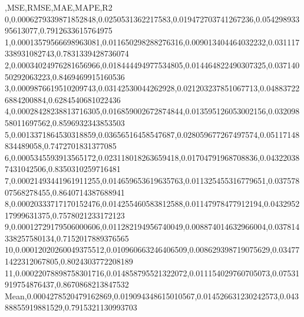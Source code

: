 ,MSE,RMSE,MAE,MAPE,R2
0,0.0006279339871852848,0.0250531362217583,0.019472703741267236,0.05429893395613077,0.7912633615764975
1,0.00013579566698963081,0.011650298288276316,0.009013404464032232,0.031117338931082743,0.7831339428736074
2,0.00034024976281656966,0.018444494977534805,0.014464822490307325,0.03714050292063223,0.8469469915160536
3,0.0009876619510209743,0.03142530044262928,0.021203237851067713,0.048837226884200884,0.6284540681022436
4,0.00028428238813716305,0.016859002672874844,0.013595126053002156,0.03209858011697562,0.8596932343853503
5,0.0013371864530318859,0.03656516458547687,0.028059677267497574,0.05117148834489058,0.7472701831377085
6,0.0005345593913565172,0.023118018263659418,0.01704791968708836,0.043220387431042506,0.8350310259716481
7,0.00021493441961911255,0.014659653619635763,0.011325455316779651,0.03757807568278455,0.8640714387688941
8,0.00020333717170152476,0.014255460583812588,0.01147978477912194,0.043295217999631375,0.7578021233172123
9,0.00012729179506000606,0.011282194956740049,0.008874014632966004,0.037814338257580134,0.7152017889376565
10,0.00012020260049375512,0.010960663246406509,0.008629398719075629,0.034771422312067805,0.8024303772208189
11,0.00022078898758301716,0.014858795521322072,0.011154029760705073,0.07531919754876437,0.8670868213847532
Mean,0.0004278520479162869,0.019094348615010567,0.014526631230242573,0.04388855919881529,0.7915321130993703
